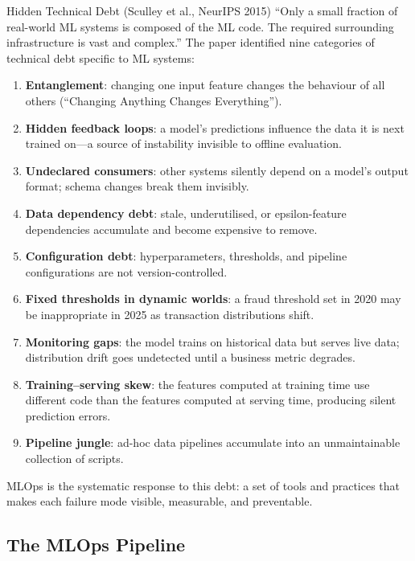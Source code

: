 \begin{keyinsight}{Hidden Technical Debt (Sculley et al., NeurIPS 2015)}
``Only a small fraction of real-world ML systems is composed of the ML
code. The required surrounding infrastructure is vast and complex.''
The paper identified nine categories of technical debt specific to ML
systems:
\begin{enumerate}
  \item \textbf{Entanglement}: changing one input feature changes the
        behaviour of all others (``Changing Anything Changes Everything'').
  \item \textbf{Hidden feedback loops}: a model's predictions influence
        the data it is next trained on---a source of instability invisible
        to offline evaluation.
  \item \textbf{Undeclared consumers}: other systems silently depend on
        a model's output format; schema changes break them invisibly.
  \item \textbf{Data dependency debt}: stale, underutilised, or
        epsilon-feature dependencies accumulate and become expensive to
        remove.
  \item \textbf{Configuration debt}: hyperparameters, thresholds, and
        pipeline configurations are not version-controlled.
  \item \textbf{Fixed thresholds in dynamic worlds}: a fraud threshold
        set in 2020 may be inappropriate in 2025 as transaction
        distributions shift.
  \item \textbf{Monitoring gaps}: the model trains on historical data
        but serves live data; distribution drift goes undetected until
        a business metric degrades.
  \item \textbf{Training--serving skew}: the features computed at training
        time use different code than the features computed at serving time,
        producing silent prediction errors.
  \item \textbf{Pipeline jungle}: ad-hoc data pipelines accumulate into
        an unmaintainable collection of scripts.
\end{enumerate}
MLOps is the systematic response to this debt: a set of tools and
practices that makes each failure mode visible, measurable, and preventable.
\end{keyinsight}

\subsection{The MLOps Pipeline}
\label{subsec:mlops-pipeline}

